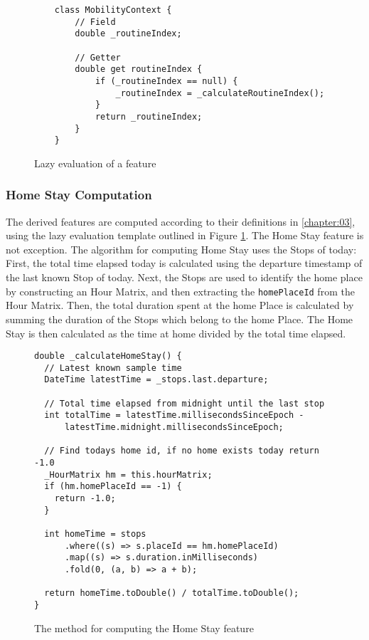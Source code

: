 \begin{figure}
    \centering
    \begin{verbatim}
    class MobilityContext {
        // Field
        double _routineIndex;
        
        // Getter
        double get routineIndex {
            if (_routineIndex == null) {
                _routineIndex = _calculateRoutineIndex();
            }
            return _routineIndex;
        }
    }
    \end{verbatim}
    \caption{Lazy evaluation of a feature}
    \label{fig:lazy-evaluation}
\end{figure}


\subsubsection{Home Stay Computation}
The derived features are computed according to their definitions in \ref{chapter:03}, using the lazy evaluation template outlined in Figure \ref{fig:lazy-evaluation}. The Home Stay feature is not exception. The algorithm for computing Home Stay uses the Stops of today: First, the total time elapsed today is calculated using the departure timestamp of the last known Stop of today. Next, the Stops are used to identify the home place by constructing an Hour Matrix, and then extracting the \verb|homePlaceId| from the Hour Matrix. Then, the total duration spent at the home Place is calculated by summing the duration of the Stops which belong to the home Place. The Home Stay is then calculated as the time at home divided by the total time elapsed.

\begin{figure}
    \centering
\begin{verbatim}
double _calculateHomeStay() {
  // Latest known sample time
  DateTime latestTime = _stops.last.departure;

  // Total time elapsed from midnight until the last stop
  int totalTime = latestTime.millisecondsSinceEpoch -
      latestTime.midnight.millisecondsSinceEpoch;

  // Find todays home id, if no home exists today return -1.0
  _HourMatrix hm = this.hourMatrix;
  if (hm.homePlaceId == -1) {
    return -1.0;
  }

  int homeTime = stops
      .where((s) => s.placeId == hm.homePlaceId)
      .map((s) => s.duration.inMilliseconds)
      .fold(0, (a, b) => a + b);

  return homeTime.toDouble() / totalTime.toDouble();
}
\end{verbatim}
    \caption{The method for computing the Home Stay feature}
    \label{fig:home-stay-code}
\end{figure}

